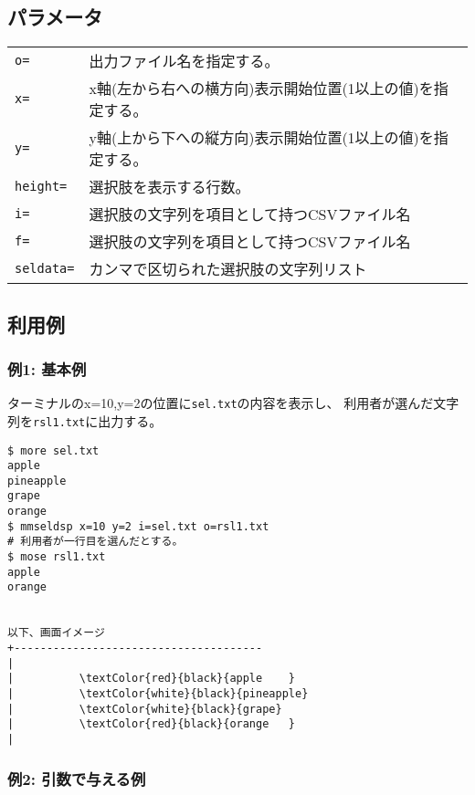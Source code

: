 \subsection*{パラメータ}
\begin{table}[htbp]
{\small
\begin{tabular}{ll}
\verb|o=|   & 出力ファイル名を指定する。\\
\verb|x=|   & x軸(左から右への横方向)表示開始位置(1以上の値)を指定する。\\
\verb|y=|   & y軸(上から下への縦方向)表示開始位置(1以上の値)を指定する。\\
\verb|height=| & 選択肢を表示する行数。 \\
\verb|i=|   & 選択肢の文字列を項目として持つCSVファイル名 \\
\verb|f=|   & 選択肢の文字列を項目として持つCSVファイル名 \\
\verb|seldata=| & カンマで区切られた選択肢の文字列リスト \\
\end{tabular} 
}
\end{table} 

\subsection*{利用例}

\subsubsection*{例1: 基本例}

ターミナルのx=10,y=2の位置に\verb|sel.txt|の内容を表示し、
利用者が選んだ文字列を\verb|rsl1.txt|に出力する。

\begin{Verbatim}[baselinestretch=0.7,frame=single,commandchars=\\\{\}]
$ more sel.txt
apple
pineapple
grape
orange
$ mmseldsp x=10 y=2 i=sel.txt o=rsl1.txt
# 利用者が一行目を選んだとする。
$ mose rsl1.txt
apple
orange


以下、画面イメージ
+--------------------------------------
|
|          \textColor{red}{black}{apple    }
|          \textColor{white}{black}{pineapple}
|          \textColor{white}{black}{grape}
|          \textColor{red}{black}{orange   }
|
\end{Verbatim}

\subsubsection*{例2: 引数で与える例}

